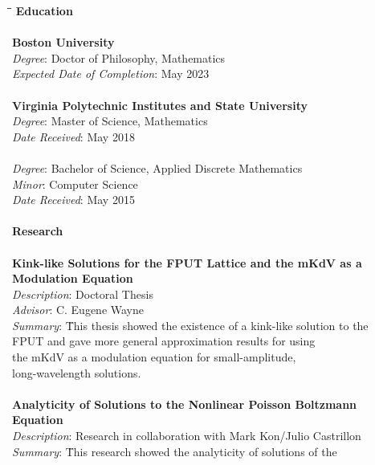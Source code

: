 \begin{center}
\begin{tabbing}
	\hspace*{1cm}\=\hspace*{1cm}\=\hspace*{2.5cm}\= \kill
	\textbf{{Education}}  \\  
	\\
	\> {\textbf{Boston University}} \\
	\> \> \emph{Degree}: Doctor of Philosophy, Mathematics   \\
	\> \>\emph{Expected Date of Completion}: May 2023 \\
	\> \\
	\> {\textbf{Virginia Polytechnic Institutes and State University}} \\
	\> \> \emph{Degree}: Master of Science, Mathematics  \\
	\>\>\emph{Date Received}: May 2018 \\
	\> \\
	\> \> \emph{Degree}: Bachelor of Science, Applied Discrete Mathematics \\
	\> \> \emph{Minor}: Computer Science \\
	\> \> \emph{Date Received}: May 2015 \\
	\> \\
	\textbf{{Research}}    \\
	\\
	\> \textbf{{Kink-like Solutions for the FPUT Lattice and the mKdV as a}}\\
	\> \textbf{{Modulation Equation}} \\
	\> \> \emph{Description}: Doctoral Thesis \\
	\> \> \emph{Advisor}: C. Eugene Wayne \\
	\> \> \emph{Summary}: \= This thesis showed the existence of a kink-like solution to the \\
	\> \> \> FPUT and gave more general approximation  results for using \\
	\> \> \> the mKdV as a modulation equation for small-amplitude, \\
	\> \> \> long-wavelength solutions. \\
	\> \\
	\> \textbf{{Analyticity of Solutions to the Nonlinear Poisson Boltzmann}} \\ 
	\> \textbf{{Equation}} \\
	\> \> \emph{Description}: Research in collaboration with Mark Kon/Julio Castrillon \\
	\> \> \emph{Summary}: \= This research showed the analyticity of solutions of the\\

\end{tabbing}
\end{center}
